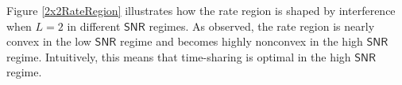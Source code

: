 \documentclass[10pt,twocolumn]{IEEEtran}
\newcommand{\0}{\mathbf{0}}
\newcommand{\1}{\mathbf{1}}
\begin{document}
Figure \ref{2x2RateRegion} illustrates how the rate region is shaped by interference when $L=2$ in different $\mathsf{SNR}$ regimes. As observed, the rate region is nearly convex in the low $\mathsf{SNR}$ regime and becomes highly nonconvex in the high $\mathsf{SNR}$ regime. Intuitively, this means that time-sharing is optimal in the high $\mathsf{SNR}$ regime.
\end{document}
